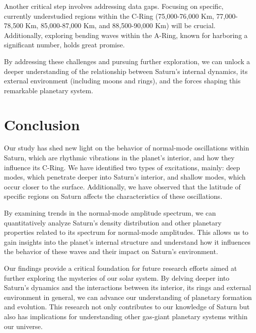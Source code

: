 \documentclass{article}
\begin{document}
Another critical step involves addressing data gaps. Focusing on specific, currently understudied regions within the C-Ring (75,000-76,000 Km, 77,000-78,500 Km, 85,000-87,000 Km, and 88,500-90,000 Km) will be crucial. Additionally, exploring bending waves within the A-Ring, known for harboring a significant number, holds great promise.

By addressing these challenges and pursuing further exploration, we can unlock a deeper understanding of the relationship between Saturn's internal dynamics, its external environment (including moons and rings), and the forces shaping this remarkable planetary system.

\section{Conclusion}

Our study has shed new light on the behavior of normal-mode oscillations within Saturn, which are rhythmic vibrations in the planet's interior, and how they influence its C-Ring. We have identified two types of excitations, mainly: deep modes, which penetrate deeper into Saturn's interior, and shallow modes, which occur closer to the surface. Additionally, we have observed that the latitude of specific regions on Saturn affects the characteristics of these oscillations.

By examining trends in the normal-mode amplitude spectrum, we can quantitatively analyze Saturn's density distribution and other planetary properties related to its spectrum for normal-mode amplitudes. This allows us to gain insights into the planet's internal structure and understand how it influences the behavior of these waves and their impact on Saturn's environment.

Our findings provide a critical foundation for future research efforts aimed at further exploring the mysteries of our solar system. By delving deeper into Saturn's dynamics and the interactions between its interior, its rings and external environment in general, we can advance our understanding of planetary formation and evolution. This research not only contributes to our knowledge of Saturn but also has implications for understanding other gas-giant planetary systems within our universe.
\end{document}
